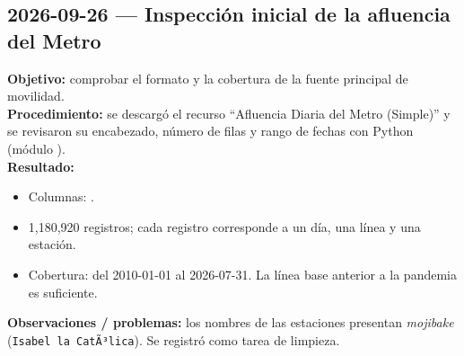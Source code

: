 \subsection{2026-09-26 --- Inspección inicial de la afluencia del Metro}
\textbf{Objetivo:} comprobar el formato y la cobertura de la fuente principal de movilidad.\\
\textbf{Procedimiento:} se descargó el recurso \enquote{Afluencia Diaria del Metro (Simple)} y se
revisaron su encabezado, número de filas y rango de fechas con Python (módulo ).\\
\textbf{Resultado:}
\begin{itemize}
  \item Columnas: .
  \item 1,180,920 registros; cada registro corresponde a un día, una línea y una estación.
  \item Cobertura: del 2010-01-01 al 2026-07-31. La línea base anterior a la pandemia es suficiente.
\end{itemize}
\textbf{Observaciones / problemas:} los nombres de las estaciones presentan \emph{mojibake}
(\texttt{Isabel la CatÃ³lica}). Se registró como tarea de limpieza.

